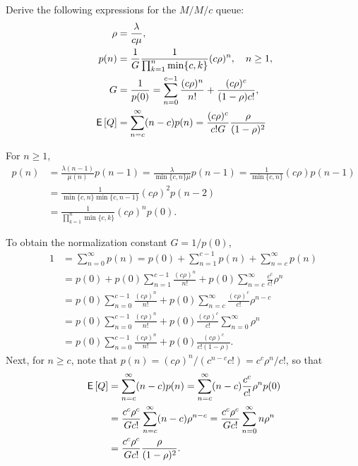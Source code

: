 \documentclass[queueing-book.tex]{subfiles}
\begin{document}
\begin{exercise}\label{ex:7}
Derive the following expressions for the  $M/M/c$ queue:
\begin{subequations}
\begin{align}
  \rho & = \frac{\lambda}{ c\mu},\\
p(n) &= \frac 1 {G} \frac{1}{\prod_{k=1}^{n}\min\{c, k\}}(c\rho)^{n} , \quad n\geq 1,\\
G &= \frac 1{p(0)} = \sum_{n=0}^{c-1} \frac{(c\rho)^n}{n!} + \frac{(c\rho)^c}{(1-\rho)c!}, \label{eq:501}\\
\,\mathsf{E}\left[Q\right] &= \sum_{n=c}^\infty (n-c) p(n) = \frac{(c\rho)^c}{c! G}\frac{\rho}{(1-\rho)^2}\\
\end{align}
\end{subequations}


\begin{solution}
  For $n\geq 1$,
 \begin{align*}
 p(n)
 &= \frac{\lambda(n-1)}{\mu(n)}p(n-1)
 = \frac{\lambda}{\min\{c, n\} \mu }p(n-1)
 = \frac{1}{\min\{c, n\}}(c\rho) p(n-1) \\
 & = \frac{1}{\min\{c, n\}\min\{c, n-1\}}(c\rho)^2 p(n-2) \\
 &= \frac{1}{\prod_{k=1}^{n}\min\{c, k\}}(c\rho)^{n} p(0).
 \end{align*}


To obtain the normalization constant $G = 1/p(0)$,
\begin{align*}
1 &= \sum_{n=0}^\infty p(n)
= p(0) + \sum_{n=1}^{c-1} p(n) + \sum_{n=c}^\infty p(n) \\
&=p(0) + p(0) \sum_{n=1}^{c-1}\frac{(c\rho)^n}{n!} +
 p(0)\sum_{n=c}^{\infty} \frac{c^c}{c!} \rho^{n} \\
&=p(0)\sum_{n=0}^{c-1}\frac{(c\rho)^n}{n!} +
 p(0) \sum_{n=c}^{\infty} \frac{(c\rho)^c}{c!} \rho^{n-c} \\
&=
p(0)\sum_{n=0}^{c-1}\frac{(c\rho)^n}{n!} +
p(0)\frac{(c\rho)^c}{c!} \sum_{n=0}^{\infty} \rho^n \\
&=
p(0) \sum_{n=0}^{c-1}\frac{(c\rho)^n}{n!} +
p(0)\frac{(c\rho)^c}{c!(1-\rho)}.
\end{align*}
Next, for $n\geq c$, note that $p(n) = (c \rho)^{n}/(c^{n-c}c!) = c^{c} \rho^{n}/c!$, so that
\begin{align*}
 \,\mathsf{E}\left[Q\right]
&=\sum_{n=c}^\infty (n-c) p(n)
=\sum_{n=c}^\infty (n-c) \frac{c^c}{c!}\rho^{n} p(0) \\
&=\frac{c^c\rho^c}{G c!} \sum_{n=c}^\infty (n-c) \rho^{n-c}
=\frac{c^c\rho^c}{G c!} \sum_{n=0}^\infty n \rho^n \\
&=\frac{c^c\rho^c}{G c!} \frac{\rho}{(1-\rho)^2}.
\end{align*}


\end{solution}
\end{exercise}
\end{document}
